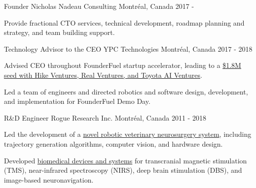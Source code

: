 \begin{cventries}
    \cventry
    {Founder}
    {Nicholas Nadeau Consulting}
    {Montréal, Canada}
    {2017 - }
    {
        \begin{cvitems}
            \item{Provide fractional CTO services, technical development, roadmap planning and strategy, and team building support.}
        \end{cvitems}
    }

    \cventry
    {Technology Advisor to the CEO}
    {YPC Technologies}
    {Montréal, Canada}
    {2017 - 2018}
    {
        \begin{cvitems}
            \item{Advised CEO throughout FounderFuel startup accelerator, leading to a \href{https://www.ypc-technologies.com/ypc-seed-round-oct2020}{\$1.8M seed with Hike Ventures, Real Ventures, and Toyota AI Ventures}.}
            \item{Led a team of engineers and directed robotics and software design, development, and implementation for FounderFuel Demo Day.}
        \end{cvitems}
    }

    \cventry
    {R\&D Engineer}
    {Rogue Research Inc.}
    {Montréal, Canada}
    {2011 - 2018}
    {
        \begin{cvitems}
            \item{Led the development of a \href{https://www.nicholasnadeau.com/publication/nadeau-2017-characterization/?q=character}{novel robotic veterinary neurosurgery system}, including trajectory generation algorithms, computer vision, and hardware design.}
            \item{Developed \href{https://www.rogue-research.com/}{biomedical devices and systems} for transcranial magnetic stimulation (TMS), near-infrared spectroscopy (NIRS), deep brain stimulation (DBS), and image-based neuronavigation.}
        \end{cvitems}
    }

\end{cventries}
